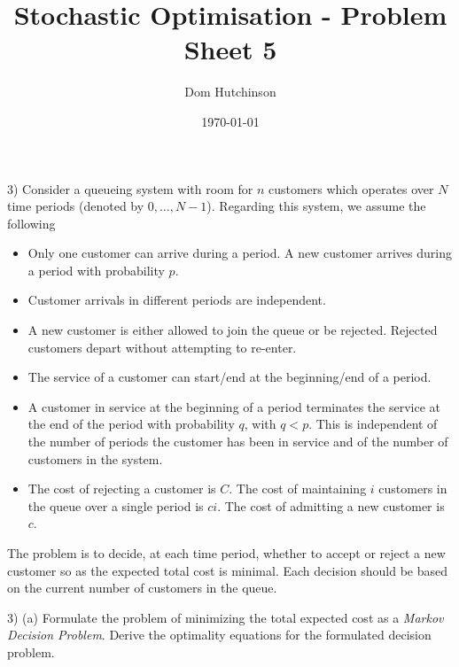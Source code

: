 \documentclass[11pt,a4paper]{article}
\begin{document}
\questionsfalse

\title{Stochastic Optimisation - Problem Sheet 5}
\author{Dom Hutchinson}
\date{\today}
\maketitle

\begin{question}{3)}
  Consider a queueing system with room for $n$ customers which operates over $N$ time periods (denoted by $0,\dots,N-1$). Regarding this system, we assume the following
  \begin{itemize}
    \item Only one customer can arrive during a period. A new customer arrives during a period with probability $p$.
    \item Customer arrivals in different periods are independent.
    \item A new customer is either allowed to join the queue or be rejected. Rejected customers depart without attempting to re-enter.
    \item The service of a customer can start/end at the beginning/end of a period.
    \item A customer in service at the beginning of a period terminates the service at the end of the period with probability $q$, with $q<p$. This is independent of the number of periods the customer has been in service and of the number of customers in the system.
    \item The cost of rejecting a customer is $C$. The cost of maintaining $i$ customers in the queue over a single period is $ci$. The cost of admitting a new customer is $c$.
  \end{itemize}
  The problem is to decide, at each time period, whether to accept or reject a new customer so as the expected total cost is minimal. Each decision should be based on the current number of customers in the queue.
\end{question}

\begin{question}{3) (a)}
  Formulate the problem of minimizing the total expected cost as a \textit{Markov Decision Problem}. Derive the optimality equations for the formulated decision problem.
\end{question}
\end{document}
